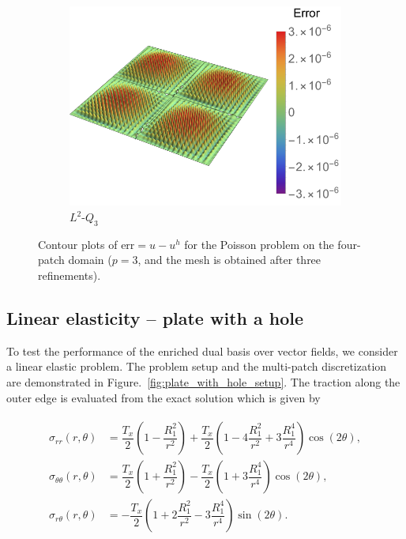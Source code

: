 \begin{figure}[ht]
\begin{subfigure}[t]{.45\linewidth}
		\includegraphics[scale=.52]{four_patch_poisson_L2_contour}
		\caption{$L^2$-$Q_3$}
	\end{subfigure}
	\caption{Contour plots of $\text{err} =u-u^h$ for the Poisson problem on the four-patch domain ($p=3$, and the mesh is obtained after three refinements). }\label{fig:contour_Poisson}
\end{figure}

\subsection{Linear elasticity -- plate with a hole}\label{sec:plate_with_a_hole}

To test the performance of the enriched dual basis over vector fields, we consider a linear elastic problem. The problem setup and the multi-patch discretization are demonstrated in Figure.~\ref{fig:plate_with_hole_setup}.  The traction along the outer edge is evaluated from the exact solution which is given by

\begin{align}
	\begin{split}
		\sigma_{rr}(r,\theta)&=\dfrac{T_x}{2}(1-\dfrac{R_1^2}{r^2})+\dfrac{T_x}{2}(1-4\dfrac{R_1^2}{r^2}+3\dfrac{R_1^4}{r^4})\cos(2\theta),\\
		\sigma_{\theta\theta}(r,\theta)&=\dfrac{T_x}{2}(1+\dfrac{R_1^2}{r^2})-\dfrac{T_x}{2}(1+3\dfrac{R_1^4}{r^4})\cos(2\theta),\\
		\sigma_{r\theta}(r,\theta)&=-\dfrac{T_x}{2}(1+2\dfrac{R_1^2}{r^2}-3\dfrac{R_1^4}{r^4})\sin(2\theta).
	\end{split}
\end{align}

